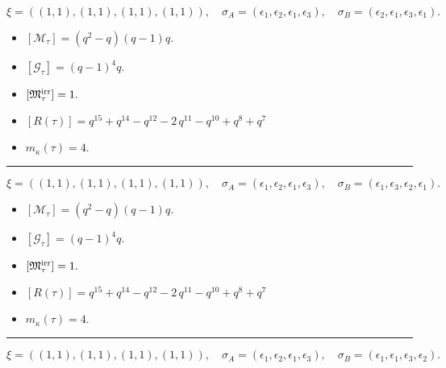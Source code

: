 \documentclass[10pt,a4paper]{amsart}
\begin{document}
$$\xi = ({(1, 1), (1, 1)}, {(1, 1)}, {(1, 1)}),\quad \sigma_A = ({{\epsilon_1}, {\epsilon_2}}, {{\epsilon_1}}, {{\epsilon_3}}),\quad \sigma_B = ({{\epsilon_2}, {\epsilon_1}}, {{\epsilon_3}}, {{\epsilon_1}}).$$

\begin{itemize}
 \item $[\mathcal{M}_{\tau}] = {\left(q^{2} - q\right)} {\left(q - 1\right)} q .$

 \item $[\mathcal{G}_{\tau}] = {\left(q - 1\right)}^{4} q .$

 \item $[{\frak M}_{\tau}^{\textrm{irr}}] = 1 .$

 \item $[R(\tau)] = q^{15} + q^{14} - q^{12} - 2 \, q^{11} - q^{10} + q^{8} + q^{7} $

 \item $m_{\kappa}(\tau) = 4 .$

 \end{itemize}
\noindent\rule{8cm}{0.4pt}

$$\xi = ({(1, 1), (1, 1)}, {(1, 1)}, {(1, 1)}),\quad \sigma_A = ({{\epsilon_1}, {\epsilon_2}}, {{\epsilon_1}}, {{\epsilon_3}}),\quad \sigma_B = ({{\epsilon_1}, {\epsilon_3}}, {{\epsilon_2}}, {{\epsilon_1}}).$$

\begin{itemize}
 \item $[\mathcal{M}_{\tau}] = {\left(q^{2} - q\right)} {\left(q - 1\right)} q .$

 \item $[\mathcal{G}_{\tau}] = {\left(q - 1\right)}^{4} q .$

 \item $[{\frak M}_{\tau}^{\textrm{irr}}] = 1 .$

 \item $[R(\tau)] = q^{15} + q^{14} - q^{12} - 2 \, q^{11} - q^{10} + q^{8} + q^{7} $

 \item $m_{\kappa}(\tau) = 4 .$

 \end{itemize}
\noindent\rule{8cm}{0.4pt}

$$\xi = ({(1, 1), (1, 1)}, {(1, 1)}, {(1, 1)}),\quad \sigma_A = ({{\epsilon_1}, {\epsilon_2}}, {{\epsilon_1}}, {{\epsilon_3}}),\quad \sigma_B = ({{\epsilon_1}, {\epsilon_1}}, {{\epsilon_3}}, {{\epsilon_2}}).$$
\end{document}
